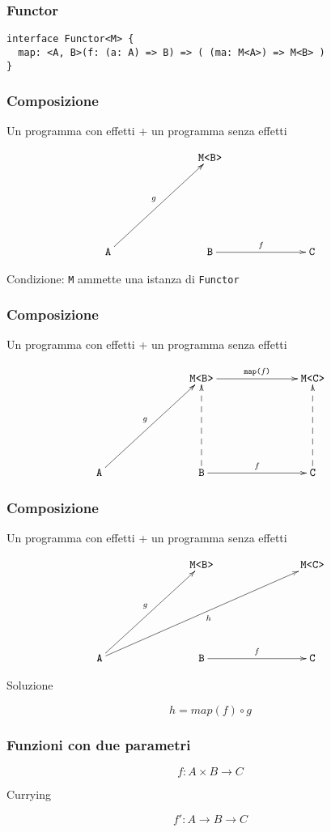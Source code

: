 \documentclass{beamer}
\begin{document}
\begin{frame}[fragile]
\frametitle{Functor}

\begin{verbatim}
interface Functor<M> {
  map: <A, B>(f: (a: A) => B) => ( (ma: M<A>) => M<B> )
}
\end{verbatim}

\end{frame}

\begin{frame}
\frametitle{Composizione}

Un programma con effetti + un programma senza effetti

\[
\xymatrixrowsep{2.5cm}
\xymatrixcolsep{2.5cm}
\xymatrix{
  & \texttt{M<B>} \\
  \texttt{A} \ar[ur]^{g} & \texttt{B} \ar[r]^{f} & \texttt{C}
}
\]

Condizione: \texttt{M} ammette una istanza di \texttt{Functor}

\end{frame}

\begin{frame}
\frametitle{Composizione}

Un programma con effetti + un programma senza effetti

\[
\xymatrixrowsep{2.5cm}
\xymatrixcolsep{2.5cm}
\xymatrix{
  & \texttt{M<B>} \ar[r]^{\texttt{map(}f\texttt{)}} & \texttt{M<C>}  \\
  \texttt{A} \ar[ur]^{g} & \texttt{B} \ar@{-->}[u] \ar[r]^{f} & \texttt{C} \ar@{-->}[u]
}
\]

\end{frame}

\begin{frame}
\frametitle{Composizione}

Un programma con effetti + un programma senza effetti

\[
\xymatrixrowsep{2.5cm}
\xymatrixcolsep{2.5cm}
\xymatrix{
  & \texttt{M<B>} & \texttt{M<C>}  \\
  \texttt{A} \ar[ur]^{g} \ar[urr]_{h} & \texttt{B} \ar[r]^{f} & \texttt{C}
}
\]

Soluzione

$$
h = map(f) \circ g
$$

\end{frame}

\begin{frame}
\frametitle{Funzioni con due parametri}

$$
f: A \times B \rightarrow C
$$

Currying

$$
f': A \rightarrow B \rightarrow C
$$

\end{frame}
\end{document}
